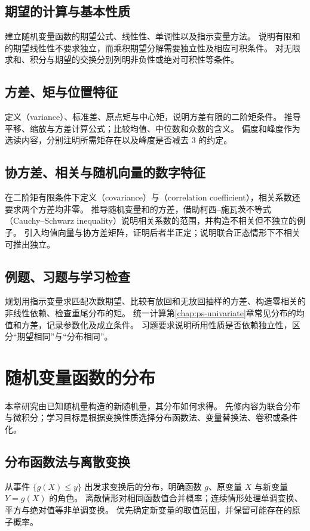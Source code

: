\documentclass[UTF8,12pt,a4paper,fontset=fandol]{ctexbook}
\begin{document}
\section{期望的计算与基本性质}
\label{sec:ps-expectation-properties}
建立随机变量函数的期望公式、线性性、单调性以及指示变量方法。
说明有限和的期望线性性不要求独立，而乘积期望分解需要独立性及相应可积条件。
对无限求和、积分与期望的交换分别列明非负性或绝对可积性等条件。

\section{方差、矩与位置特征}
\label{sec:ps-variance-moments}
定义（variance）、标准差、原点矩与中心矩，说明方差有限的二阶矩条件。
推导平移、缩放与方差计算公式；比较均值、中位数和众数的含义。
偏度和峰度作为选读内容，分别注明所需矩存在以及峰度是否减去 $3$ 的约定。

\section{协方差、相关与随机向量的数字特征}
\label{sec:ps-covariance-correlation}
在二阶矩有限条件下定义（covariance）与（correlation coefficient），相关系数还要求两个方差均非零。
推导随机变量和的方差，借助柯西--施瓦茨不等式（Cauchy--Schwarz inequality）说明相关系数的范围，并构造不相关但不独立的例子。
引入均值向量与协方差矩阵，证明后者半正定；说明联合正态情形下不相关可推出独立。

\section{例题、习题与学习检查}
规划用指示变量求匹配次数期望、比较有放回和无放回抽样的方差、构造零相关的非线性依赖、检查重尾分布的矩。
统一计算第\ref{chap:ps-univariate}章常见分布的均值和方差，记录参数化及成立条件。
习题要求说明所用性质是否依赖独立性，区分“期望相同”与“分布相同”。


\chapter{随机变量函数的分布}
\label{chap:ps-transformations}

本章研究由已知随机量构造的新随机量，其分布如何求得。
先修内容为联合分布与微积分；学习目标是根据变换性质选择分布函数法、变量替换法、卷积或条件化。

\section{分布函数法与离散变换}
\label{sec:ps-cdf-transform}
从事件 $\{g(X)\leq y\}$ 出发求变换后的分布，明确函数 $g$、原变量 $X$ 与新变量 $Y=g(X)$ 的角色。
离散情形对相同函数值合并概率；连续情形处理单调变换、平方与绝对值等非单调变换。
优先确定新变量的取值范围，并保留可能存在的原子概率。
\end{document}
